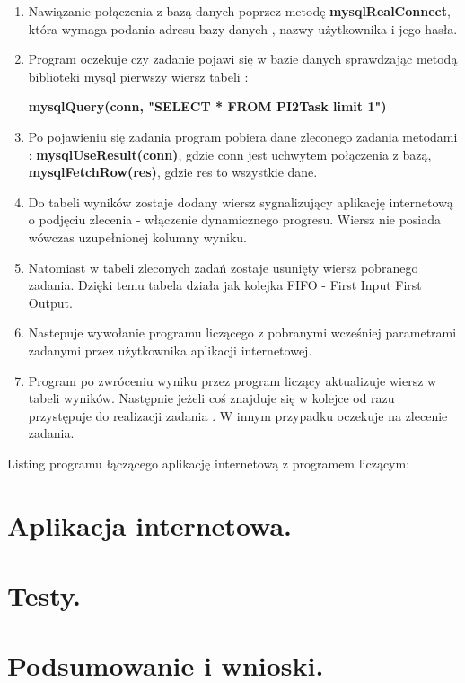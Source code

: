 \documentclass[a4paper,12pt]{article}		%
\begin{document}
\begin{enumerate}
\item Nawiązanie połączenia z bazą danych poprzez metodę \textbf{mysqlRealConnect}, która wymaga podania adresu bazy danych , nazwy użytkownika i jego hasła.

\item Program oczekuje czy zadanie pojawi się w bazie danych sprawdzając metodą biblioteki mysql pierwszy wiersz tabeli :

\begin{center}
\textbf{mysqlQuery(conn, "SELECT * FROM PI2Task limit 1")}
\end{center}

\item Po pojawieniu się zadania program pobiera dane zleconego zadania metodami : \textbf{mysqlUseResult(conn)}, gdzie conn jest uchwytem połączenia z bazą, \textbf{mysqlFetchRow(res)}, gdzie res to wszystkie dane.

\item Do tabeli wyników zostaje dodany wiersz sygnalizujący aplikację internetową o podjęciu zlecenia - włączenie dynamicznego progresu. Wiersz nie posiada wówczas uzupełnionej kolumny wyniku.

\item Natomiast  w tabeli zleconych zadań zostaje usunięty wiersz pobranego zadania. Dzięki temu tabela działa jak kolejka FIFO - First Input First Output. 

\item Nastepuje wywołanie programu liczącego z pobranymi wcześniej parametrami zadanymi przez użytkownika aplikacji internetowej. 

\item Program po zwróceniu wyniku przez program liczący aktualizuje wiersz w tabeli wyników. Następnie jeżeli coś znajduje się w kolejce od razu przystępuje do realizacji zadania . W innym przypadku oczekuje na zlecenie zadania. 
\end{enumerate}

Listing programu łączącego aplikację internetową z programem liczącym:



\section{Aplikacja internetowa.}

\section{Testy.}

\section{Podsumowanie i wnioski.}
\end{document}
